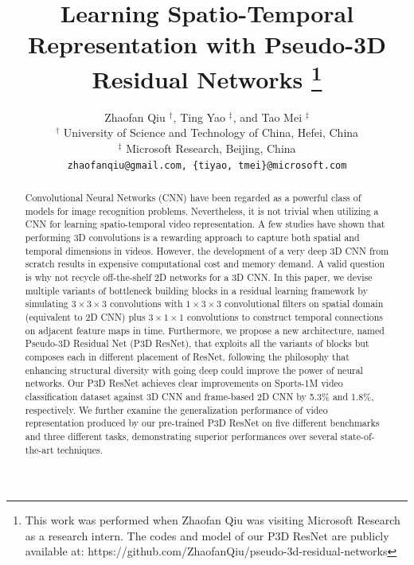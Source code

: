 \documentclass[10pt,twocolumn,letterpaper]{article}
\begin{document}
\title{Learning Spatio-Temporal Representation with Pseudo-3D Residual Networks
\thanks{{\small This work was performed when Zhaofan Qiu was visiting Microsoft Research as a research intern. The codes and model of our P3D ResNet are publicly available at: https://github.com/ZhaofanQiu/pseudo-3d-residual-networks}}}
\author{Zhaofan Qiu $^{\dag}$, Ting Yao $^{\ddag}$, and Tao Mei $^{\ddag}$\\
$^{\dag}$ University of Science and Technology of China, Hefei, China\\
$^{\ddag}$ Microsoft Research, Beijing, China\\
{\tt\small zhaofanqiu@gmail.com, \{tiyao, tmei\}@microsoft.com}
}

\maketitle
\thispagestyle{empty}

\begin{abstract}
Convolutional Neural Networks (CNN) have been regarded as a powerful class of models for image recognition problems. Nevertheless, it is not trivial when utilizing a CNN for learning spatio-temporal video representation. A few studies have shown that performing 3D convolutions is a rewarding approach to capture both spatial and temporal dimensions in videos. However, the development of a very deep 3D CNN from scratch results in expensive computational cost and memory demand. A valid question is why not recycle off-the-shelf 2D networks for a 3D CNN. In this paper, we devise multiple variants of bottleneck building blocks in a residual learning framework by simulating $3\times3\times3$ convolutions with $1\times3\times3$ convolutional filters on spatial domain (equivalent to 2D CNN) plus $3\times1\times1$ convolutions to construct temporal connections on adjacent feature maps in time. Furthermore, we propose a new architecture, named Pseudo-3D Residual Net (P3D ResNet), that exploits all the variants of blocks but composes each in different placement of ResNet, following the philosophy that enhancing structural diversity with going deep could improve the power of neural networks. Our P3D ResNet achieves clear improvements on Sports-1M video classification dataset against 3D CNN and frame-based 2D CNN by 5.3\% and 1.8\%, respectively. We further examine the generalization performance of video representation produced by our pre-trained P3D ResNet on five different benchmarks and three different tasks, demonstrating superior performances over several state-of-the-art techniques.
\end{abstract}
\end{document}
